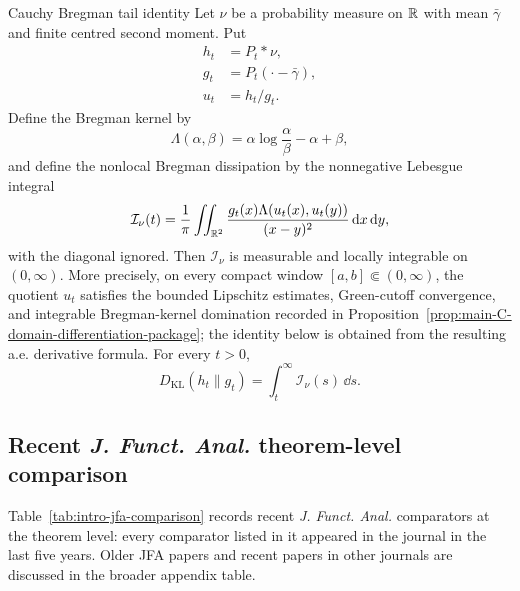 \begin{maintheorem}{Cauchy Bregman tail identity}
\label{thm:main-C}
Let \(\nu\) be a probability measure on \(\mathbb{R}\) with mean \(\bar{\gamma}\) and
finite centred second moment.  Put
\[
\begin{aligned}
h_t&=P_t*\nu,\\
g_t&=P_t(\cdot-\bar{\gamma}),\\
u_t&=h_t/g_t .
\end{aligned}
\]
Define the Bregman kernel by
\[
\Lambda(\alpha,\beta)=\alpha\log\frac{\alpha}{\beta}-\alpha+\beta,
\]
and define the nonlocal Bregman dissipation by the nonnegative Lebesgue
integral
\[
\mathcal I_\nu(t)
=\frac1\pi\iint_{\mathbb{R}^2}
\frac{g_t(x)\Lambda(u_t(x),u_t(y))}{(x-y)^2}\,\mathrm{d} x\,\mathrm{d} y ,
\]
with the diagonal ignored.  Then \(\mathcal I_\nu\) is measurable and locally
integrable on \((0,\infty)\).  More precisely, on every compact window
\([a,b]\Subset(0,\infty)\), the quotient \(u_t\) satisfies the bounded
Lipschitz estimates, Green-cutoff convergence, and integrable Bregman-kernel
domination recorded in
Proposition~\ref{prop:main-C-domain-differentiation-package}; the identity
below is obtained from the resulting a.e. derivative formula.  For every
\(t>0\),
\[
D_{\mathrm{KL}}(h_t\|g_t)=\int_t^\infty \mathcal I_\nu(s)\,\dd s .
\]
\end{maintheorem}

\subsection*{Recent \emph{J. Funct. Anal.} theorem-level comparison}
\label{subsec:intro-recent-jfa-comparison}

Table~\ref{tab:intro-jfa-comparison} records recent
\emph{J. Funct. Anal.} comparators at the theorem level: every comparator
listed in it appeared in the journal in the last five years.  Older JFA
papers and recent papers in other journals are discussed in the broader
appendix table.

